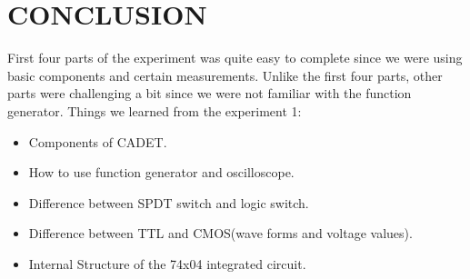 \documentclass[pdftex,12pt,a4paper]{article}
\begin{document}
\section{CONCLUSION}
First four parts of the experiment was quite easy to complete since we were using basic components and certain measurements. Unlike the first four parts, other parts were challenging a bit since we were not familiar with the function generator.
\newline
\newline Things we learned from the experiment 1:
\begin{itemize}
    \item   Components of CADET.
    \item   How to use function generator and oscilloscope.
    \item   Difference between SPDT switch and logic switch.
    \item   Difference between TTL and CMOS(wave forms and voltage values).
    \item   Internal Structure of the 74x04 integrated circuit.
\end{itemize}

\newpage
\nocite{*}




\newpage
{}

\end{document}
